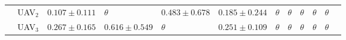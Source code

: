 \documentclass[11pt,openany]{book}
\begin{document}
\begin{table}[H]
\begin{tabular}{|p{0.8cm}|p{0.7cm}|p{0.7cm}|p{0.7cm}|p{0.7cm}|p{0.7cm}|p{0.7cm}|p{0.7cm}|p{0.7cm}|p{0.7cm}|p{0.7cm}|p{1cm}|}
                                                               & UAV$_2$                                                                  & $0.107 \pm 0.111$                                                        & $\theta$                                                                 & $0.483 \pm 0.678$                 & $0.185 \pm 0.244$ & $\theta$ & $\theta$ & $\theta$ & $\theta$          & $\theta$          &                       \\\cline{2-11}
                                                               & UAV$_3$                                                                  & $0.267 \pm 0.165$                                                        & $0.616 \pm 0.549$                                                        & $\theta$                          & $0.251 \pm 0.109$ & $\theta$ & $\theta$ & $\theta$ & $\theta$          & $\theta$          &                       \\\hline
    \end{tabular}
\end{table}
\end{document}
